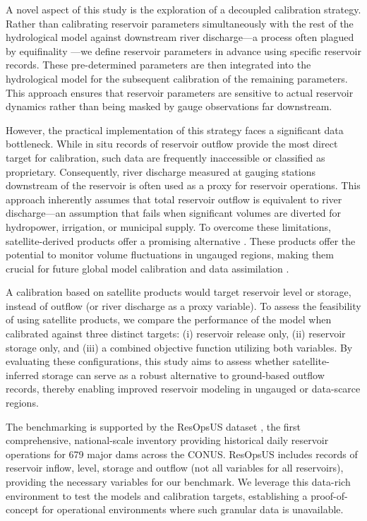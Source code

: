 \documentclass[hess, manuscript]{copernicus}
\begin{document}
A novel aspect of this study is the exploration of a decoupled calibration strategy. Rather than calibrating reservoir parameters simultaneously with the rest of the hydrological model against downstream river discharge—a process often plagued by equifinality \citep{Beven2001}—we define reservoir parameters in advance using specific reservoir records. These pre-determined parameters are then integrated into the hydrological model for the subsequent calibration of the remaining parameters. This approach ensures that reservoir parameters are sensitive to actual reservoir dynamics rather than being masked by gauge observations far downstream.

However, the practical implementation of this strategy faces a significant data bottleneck. While in situ records of reservoir outflow provide the most direct target for calibration, such data are frequently inaccessible or classified as proprietary. Consequently, river discharge measured at gauging stations downstream of the reservoir is often used as a proxy for reservoir operations. This approach inherently assumes that total reservoir outflow is equivalent to river discharge—an assumption that fails when significant volumes are diverted for hydropower, irrigation, or municipal supply. To overcome these limitations, satellite-derived products offer a promising alternative \citep{Schwatke2015, Pekel2016, Schwatke2020, Donchyts2022, Khandelwal2022, Hao2024, Hou2024}. These products offer the potential to monitor volume fluctuations in ungauged regions, making them crucial for future global model calibration and data assimilation \citep{Hanazaki2022, Shen2025, Steyaert2025}.

A calibration based on satellite products would target reservoir level or storage, instead of outflow (or river discharge as a proxy variable). To assess the feasibility of using satellite products, we compare the performance of the model when calibrated against three distinct targets: (i) reservoir release only, (ii) reservoir storage only, and (iii) a combined objective function utilizing both variables. By evaluating these configurations, this study aims to assess whether satellite-inferred storage can serve as a robust alternative to ground-based outflow records, thereby enabling improved reservoir modeling in ungauged or data-scarce regions. 

The benchmarking is supported by the ResOpsUS dataset \citep{Steyaert2022, Steyaert2024}, the first comprehensive, national-scale inventory providing historical daily reservoir operations for 679 major dams across the CONUS. ResOpsUS includes records of reservoir inflow, level, storage and outflow (not all variables for all reservoirs), providing the necessary variables for our benchmark. We leverage this data-rich environment to test the models and calibration targets, establishing a proof-of-concept for operational environments where such granular data is unavailable.
\end{document}
